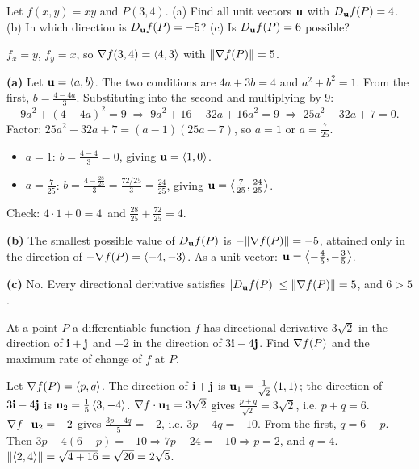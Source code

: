 \begin{problem}\label{prob:p17}
Let $f(x,y)=xy$ and $P(3,4)$.
(a) Find all unit vectors $\mathbf{u}$ with $D_{\mathbf{u}} f(P)=4$.
(b) In which direction is $D_{\mathbf{u}} f(P)=-5$?
(c) Is $D_{\mathbf{u}} f(P)=6$ possible?
\end{problem}
\begin{solution}
 $f_x=y$, $f_y=x$, so $\nabla f(3,4)=\left\langle 4,3 \right\rangle$ with $\lVert\nabla f(P)\rVert=5$.

\textbf{(a)} Let $\mathbf{u}=\left\langle a,b \right\rangle$. The two conditions are $4a+3b=4$ and $a^2+b^2=1$.
From the first, $b=\frac{4-4a}{3}$. Substituting into the second and multiplying by $9$:
\[
  9a^2+(4-4a)^2=9\;\Longrightarrow\;9a^2+16-32a+16a^2=9\;\Longrightarrow\;25a^2-32a+7=0 .
\]
Factor: $25a^2-32a+7=(a-1)(25a-7)$, so $a=1$ or $a=\frac{7}{25}$.
\begin{itemize}
\item $a=1$: $b=\frac{4-4}{3}=0$, giving $\mathbf{u}=\left\langle 1,0 \right\rangle$.
\item $a=\frac{7}{25}$: $b=\frac{4-\frac{28}{25}}{3}=\frac{72/25}{3}=\frac{24}{25}$, giving $\mathbf{u}=\left\langle \frac{7}{25},\frac{24}{25} \right\rangle$.
\end{itemize}
Check: $4\cdot1+0=4$\checkok\ and $\frac{28}{25}+\frac{72}{25}=4$\checkok.

\textbf{(b)} The smallest possible value of $D_{\mathbf{u}} f(P)$ is $-\lVert\nabla f(P)\rVert=-5$, attained only in the
direction of $-\nabla f(P)=\left\langle -4,-3 \right\rangle$. As a unit vector: $\mathbf{u}=\left\langle -\frac45,-\frac35 \right\rangle$.

\textbf{(c)} No. Every directional derivative satisfies $\lvert D_{\mathbf{u}} f(P)\rvert\le\lVert\nabla f(P)\rVert=5$, and $6>5$.
\end{solution}

\begin{problem}[$*$]\label{prob:p25}
At a point $P$ a differentiable function $f$ has directional derivative
$3\sqrt2$ in the direction of $\mathbf{i}+\mathbf{j}$ and $-2$ in the direction of $3\mathbf{i}-4\mathbf{j}$.
Find $\nabla f(P)$ and the maximum rate of change of $f$ at $P$.
\end{problem}
\begin{solution}
 Let $\nabla f(P)=\left\langle p,q \right\rangle$.
 The direction of $\mathbf{i}+\mathbf{j}$ is $\mathbf{u}_1=\frac{1}{\sqrt2}\left\langle 1,1 \right\rangle$; the direction of
$3\mathbf{i}-4\mathbf{j}$ is $\mathbf{u}_2=\frac15\left\langle 3,-4 \right\rangle$.
 $\nabla f\cdot\mathbf{u}_1=3\sqrt2$ gives $\frac{p+q}{\sqrt2}=3\sqrt2$, i.e. $p+q=6$.
$\nabla f\cdot\mathbf{u}_2=-2$ gives $\frac{3p-4q}{5}=-2$, i.e. $3p-4q=-10$.
 From the first, $q=6-p$. Then $3p-4(6-p)=-10\Rightarrow7p-24=-10\Rightarrow p=2$, and $q=4$.
 $\lVert\left\langle 2,4 \right\rangle\rVert=\sqrt{4+16}=\sqrt{20}=2\sqrt5$.
\end{solution}

